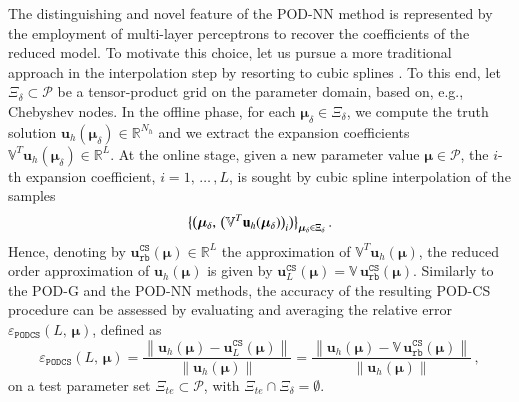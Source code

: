 \documentclass[longtitle]{elsarticle}
\numberwithin{equation}{section}
\theoremstyle{theorem}
\theoremstyle{definition}
\theoremstyle{remark}
\theoremstyle{proposition}
\numberwithin{figure}{section}
\newcommand{\norm}[1]{\left\lVert#1\right\rVert}
\newcommand{\bg}[1]{\boldsymbol{#1}}
\begin{document}
		The distinguishing and novel feature of the POD-NN method is represented by the employment of multi-layer perceptrons to recover the coefficients of the reduced model. To motivate this choice, let us pursue a more traditional approach in the interpolation step by resorting to cubic splines \cite{Deb78}. To this end, let $\Xi_{\delta} \subset \mathcal{P}$ be a tensor-product grid on the parameter domain, based on, e.g., Chebyshev nodes. In the offline phase, for each $\bg{\mu}_{\delta} \in \Xi_{\delta}$, we compute the truth solution $\mathbf{u}_h(\bg{\mu}_{\delta}) \in \mathbb{R}^{N_h}$ and we extract the expansion coefficients $\mathbb{V}^T \mathbf{u}_h(\bg{\mu}_{\delta}) \in \mathbb{R}^L$. At the online stage, given a new parameter value $\bg{\mu} \in \mathcal{P}$, the $i$-th expansion coefficient, $i = 1, \, \ldots \, , L$, is sought by cubic spline interpolation of the samples 
		\vspace*{-0.1cm}
		\begin{equation*}
			\big\lbrace \big( \bg{\mu}_{\delta}, \, \big( \mathbb{V}^T \mathbf{u}_h(\bg{\mu}_{\delta}) \big)_i \big) \big\rbrace_{\bg{\mu}_{\delta} \in \Xi_{\delta}} \, . 
			\vspace*{-0.1cm}
		\end{equation*}
		Hence, denoting by $\mathbf{u}_{\texttt{rb}}^{\texttt{CS}}(\bg{\mu}) \in \mathbb{R}^L$ the approximation of $\mathbb{V}^T \mathbf{u}_h(\bg{\mu})$, the reduced order approximation of $\mathbf{u}_h(\bg{\mu})$ is given by $\mathbf{u}_L^{\texttt{CS}}(\bg{\mu}) = \mathbb{V} \, \mathbf{u}_{\texttt{rb}}^{\texttt{CS}}(\bg{\mu})$. Similarly to the POD-G and the POD-NN methods, the accuracy of the resulting POD-CS procedure can be assessed by evaluating and averaging the relative error $\varepsilon_{\texttt{PODCS}}^{}(L, \, \bg{\mu})$, defined as
		\vspace*{-0.1cm}
		\begin{equation*}
			\varepsilon_{\texttt{PODCS}}^{}(L, \, \bg{\mu}) = \dfrac{\norm{\mathbf{u}_h(\bg{\mu}) - \mathbf{u}_L^{\texttt{CS}}(\bg{\mu})}}{\norm{\mathbf{u}_h(\bg{\mu})}} = \dfrac{\norm{\mathbf{u}_h(\bg{\mu}) - \mathbb{V} \, \mathbf{u}_{\texttt{rb}}^{\texttt{CS}}(\bg{\mu})}}{\norm{\mathbf{u}_h(\bg{\mu})}} \, ,
		\end{equation*}
		on a test parameter set $\Xi_{te} \subset \mathcal{P}$, with $\Xi_{te} \cap \Xi_{\delta} = \emptyset$.
				
\end{document}
